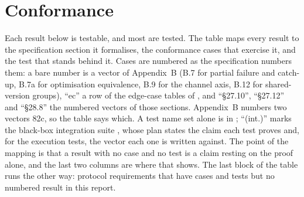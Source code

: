 \section{Conformance}
\label{sec:conformance}

Each result below is testable, and most are tested. The table maps every
result to the specification section it formalises, the conformance cases
that exercise it, and the test that stands behind it. Cases are numbered as
the specification numbers them: a bare number is a vector of \SPEC{}
Appendix~B (B.7 for partial failure and catch-up, B.7a for optimisation
equivalence, B.9 for the channel axis, B.12 for shared-version groups),
``ec'' a row of the edge-case tables of , and ``\S27.10'',
``\S27.12'' and ``\S28.8'' the numbered vectors of those sections. Appendix~B
numbers two vectors 82c, so the table says which. A test name set alone is
in ; ``(int.)'' marks the black-box
integration suite , whose plan states the claim each
test proves and, for the execution tests, the vector each one is written
against. The point of the mapping is that a result with no case and no test
is a claim resting on the proof alone, and the last two columns are where
that shows. The last block of the table runs the other way: protocol
requirements that have cases and tests but no numbered result in this
report.


